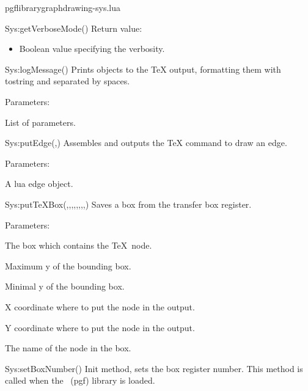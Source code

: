 \begin{filedescription}{pgflibrarygraphdrawing-sys.lua}
\begin{luacommand}{{Sys:getVerboseMode}()}
Return value:
\begin{itemize} \item[] Boolean value specifying the verbosity. \end{itemize}


\end{luacommand}\begin{luacommand}{{Sys:logMessage}()}
Prints objects to the TeX output, formatting them with tostring and separated by spaces.

Parameters:
\begin{parameterdescription}
	\item[\meta{...}] List of parameters.
\end{parameterdescription}



\end{luacommand}\begin{luacommand}{{Sys:putEdge}(,)}
Assembles and outputs the TeX command to draw an edge.

Parameters:
\begin{parameterdescription}
	\item[\meta{Edge}] A lua edge object.
\end{parameterdescription}



\end{luacommand}\begin{luacommand}{{Sys:putTeXBox}(,,,,,,,,)}
Saves a box from the transfer box register.

Parameters:
\begin{parameterdescription}
	\item[\meta{texnode}] The box which contains the \TeX\ node.\item[\meta{minX}] Maximum y of the bounding box.\item[\meta{minY}] Minimal y of the bounding box.\item[\meta{posX}] X coordinate where to put the node in the output.\item[\meta{posY}] Y coordinate where to put the node in the output.\item[\meta{nodeName}] The name of the node in the box.
\end{parameterdescription}



\end{luacommand}\begin{luacommand}{{Sys:setBoxNumber}()}
Init method, sets the box register number. This method is called when the \tikzname\ (pgf) library is loaded.


\end{luacommand}
\end{filedescription}
